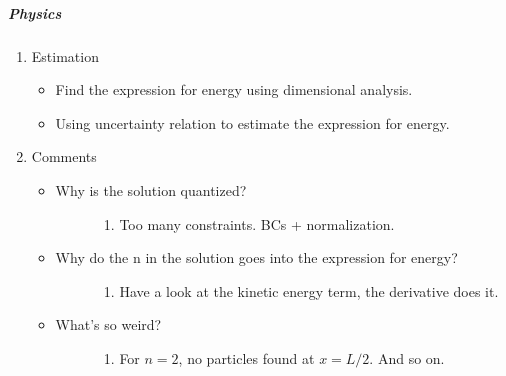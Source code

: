 \documentclass[letterpaper,10pt,english]{sphinxmanual}
\begin{document}
\subparagraph{Physics}
\label{QuantumMechanics:physics}\begin{enumerate}
\item {} 
Estimation
\begin{itemize}
\item {} 
Find the expression for energy using dimensional analysis.

\item {} 
Using uncertainty relation to estimate the expression for energy.

\end{itemize}

\item {} 
Comments
\begin{itemize}
\item {} \begin{description}
\item[{Why is the solution quantized?}] \leavevmode\begin{enumerate}
\item {} 
Too many constraints. BCs + normalization.

\end{enumerate}

\end{description}

\item {} \begin{description}
\item[{Why do the n in the solution goes into the expression for energy?}] \leavevmode\begin{enumerate}
\item {} 
Have a look at the kinetic energy term, the derivative does it.

\end{enumerate}

\end{description}

\item {} \begin{description}
\item[{What's so weird?}] \leavevmode\begin{enumerate}
\item {} 
For $n=2$, no particles found at $x=L/2$. And so on.

\end{enumerate}

\end{description}

\end{itemize}

\end{enumerate}
\end{document}
